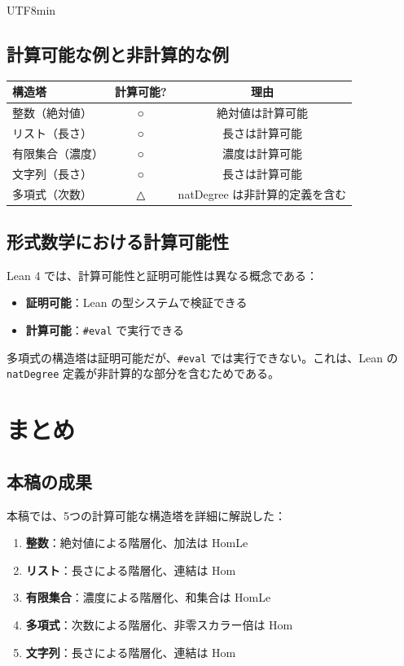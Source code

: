 \documentclass[12pt,a4paper]{article}
\theoremstyle{definition}
\theoremstyle{remark}
\begin{document}
\begin{CJK}{UTF8}{min}
\subsection{計算可能な例と非計算的な例}

\begin{center}
\begin{tabular}{|l|c|c|}
\hline
\textbf{構造塔} & \textbf{計算可能?} & \textbf{理由} \\
\hline
整数（絶対値） & ○ & 絶対値は計算可能 \\
リスト（長さ） & ○ & 長さは計算可能 \\
有限集合（濃度） & ○ & 濃度は計算可能 \\
文字列（長さ） & ○ & 長さは計算可能 \\
多項式（次数） & △ & natDegree は非計算的定義を含む \\
\hline
\end{tabular}
\end{center}

\subsection{形式数学における計算可能性}

Lean 4 では、計算可能性と証明可能性は異なる概念である：

\begin{itemize}
\item \textbf{証明可能}：Lean の型システムで検証できる
\item \textbf{計算可能}：\texttt{\#eval} で実行できる
\end{itemize}

多項式の構造塔は証明可能だが、\texttt{\#eval} では実行できない。これは、Lean の \texttt{natDegree} 定義が非計算的な部分を含むためである。

\section{まとめ}

\subsection{本稿の成果}

本稿では、5つの計算可能な構造塔を詳細に解説した：

\begin{enumerate}
\item \textbf{整数}：絶対値による階層化、加法は HomLe
\item \textbf{リスト}：長さによる階層化、連結は Hom
\item \textbf{有限集合}：濃度による階層化、和集合は HomLe
\item \textbf{多項式}：次数による階層化、非零スカラー倍は Hom
\item \textbf{文字列}：長さによる階層化、連結は Hom
\end{enumerate}


\end{CJK}
\end{document}
